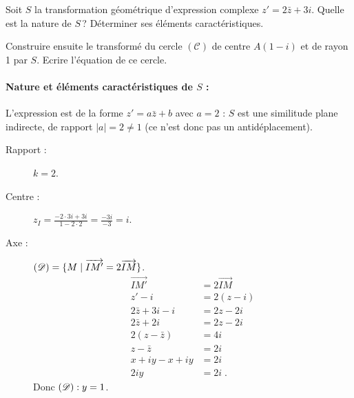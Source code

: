             \begin{ex}
                  Soit $S$ la transformation g\'eom\'etrique d'expression complexe $z'=2\bar{z}+3i$.
                  Quelle est la nature de $S$\,? D\'eterminer ses \'el\'ements caract\'eristiques.
                  
                  Construire ensuite le transform\'e du cercle $(\mathscr{C})$ de centre $A(1-i)$ et de rayon 1 par $S$.
                  Ecrire l'\'equation de ce cercle.
                  \begin{valiny}
                  \begin{minipage}{.5\actualtextwidth}
                        \paragraph{Nature et \'el\'ements caract\'eristiques de $S$ :}
                              L'expression est de la forme $z' = a\bar{z} + b$ avec $a = 2$ : $S$ est une similitude plane indirecte,
                              de rapport $|a| = 2 \neq 1$ (ce n'est donc pas un antid\'eplacement).
                              \begin{description}
                                    \item[Rapport :] $k = 2$.
                                    \item[Centre :] $z_I = \frac{-2 \cdot 3i + 3i}{1 - 2 \cdot 2} = \frac{-3i}{-3} = i$.
                                    \item[Axe :] $(\mathscr{D}) = \{ M \mid \overrightarrow{IM'} = 2 \overrightarrow{IM} \}$.
                                          \begin{align*}
                                                \overrightarrow{IM'} & = 2 \overrightarrow{IM} \\
                                                z' - i               & = 2 ( z - i )           \\
                                                2 \bar{z} + 3i - i   & = 2 z - 2 i             \\
                                                2 \bar{z} + 2 i      & = 2 z - 2 i             \\
                                                2 (z - \bar{z})      & = 4 i                   \\
                                                z - \bar{z}          & = 2 i                   \\
                                                x + i y - x + i y    & = 2 i                   \\
                                                2 i y                & = 2 i                   \;.
                                          \end{align*}
                                          Donc $(\mathscr{D}) : y = 1$.
                              \end{description}

\end{minipage}
\end{valiny}
\end{ex}
